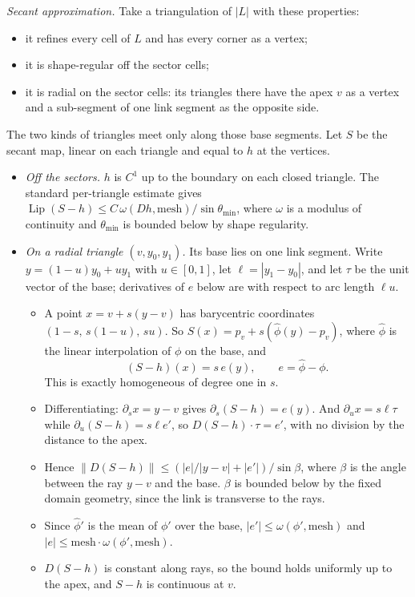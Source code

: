 \emph{Secant approximation.} Take a triangulation of $|L|$ with these properties:
\begin{itemize}
\item it refines every cell of $L$ and has every corner as a vertex;
\item it is shape-regular off the sector cells;
\item it is radial on the sector cells: its triangles there have the apex $v$ as a vertex and a sub-segment of one link
segment as the opposite side.
\end{itemize}
The two kinds of triangles meet only along those base segments. Let $S$ be the secant map, linear on each triangle and
equal to $h$ at the vertices.
\begin{itemize}
\item \emph{Off the sectors.} $h$ is $C^1$ up to the boundary on each closed triangle. The standard per-triangle
estimate gives $\operatorname{Lip}(S-h)\le C\,\omega(Dh,\mathrm{mesh})/\sin\theta_{\min}$, where $\omega$ is a modulus
of continuity and $\theta_{\min}$ is bounded below by shape regularity.
\item \emph{On a radial triangle $(v,y_0,y_1)$.} Its base lies on one link segment. Write $y=(1-u)y_0+uy_1$ with
$u\in[0,1]$, let $\ell=|y_1-y_0|$, and let $\tau$ be the unit vector of the base; derivatives of $e$ below are with
respect to arc length $\ell u$.
  \begin{itemize}
  \item A point $x=v+s(y-v)$ has barycentric coordinates $(1-s,\,s(1-u),\,su)$. So $S(x)=p_v+s(\hat\phi(y)-p_v)$,
  where $\hat\phi$ is the linear interpolation of $\phi$ on the base, and
  \[
  (S-h)(x)=s\,e(y),\qquad e=\hat\phi-\phi .
  \]
  This is exactly homogeneous of degree one in $s$.
  \item Differentiating: $\partial_s x=y-v$ gives $\partial_s(S-h)=e(y)$. And $\partial_u x=s\ell\tau$ while
  $\partial_u(S-h)=s\ell e'$, so $D(S-h)\cdot\tau=e'$, with no division by the distance to the apex.
  \item Hence $\|D(S-h)\|\le(|e|/|y-v|+|e'|)/\sin\beta$, where $\beta$ is the angle between the ray $y-v$ and the base.
  $\beta$ is bounded below by the fixed domain geometry, since the link is transverse to the rays.
  \item Since $\hat\phi'$ is the mean of $\phi'$ over the base, $|e'|\le\omega(\phi',\mathrm{mesh})$ and
  $|e|\le\mathrm{mesh}\cdot\omega(\phi',\mathrm{mesh})$.
  \item $D(S-h)$ is constant along rays, so the bound holds uniformly up to the apex, and $S-h$ is continuous at $v$.

\end{itemize}
\end{itemize}
